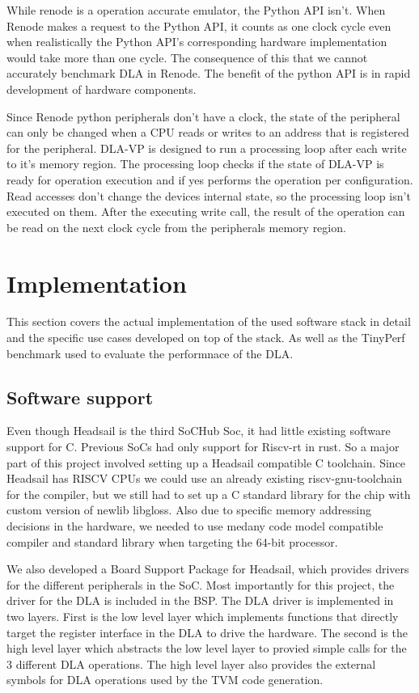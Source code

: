 \documentclass[12pt,a4paper,english
]{tunithesis}
\begin{document}
While renode is a operation accurate emulator, the Python API isn't. When Renode makes a request to the Python API, it counts as one clock cycle even when realistically the Python API's corresponding hardware implementation would take more than one cycle. The consequence of this that we cannot accurately benchmark DLA in Renode. The benefit of the python API is in rapid development of hardware components.

Since Renode python peripherals don't have a clock, the state of the peripheral can only be changed when a CPU reads or writes to an address that is registered for the peripheral. DLA-VP is designed to run a processing loop after each write to it's memory region. The processing loop checks if the state of DLA-VP is ready for operation execution and if yes performs the operation per configuration. Read accesses don't change the devices internal state, so the processing loop isn't executed on them. After the executing write call, the result of the operation can be read on the next clock cycle from the peripherals memory region.

\chapter{Implementation}
\label{ch:implementation}
This section covers the actual implementation of the used software stack in detail and the specific use cases developed on top of the stack. As well as the TinyPerf benchmark used to evaluate the performnace of the DLA.

\section{Software support}
\label{sec:software_support}
Even though Headsail is the third SoCHub Soc, it had little existing software support for C. Previous SoCs had only support for Riscv-rt in rust. So a major part of this project involved setting up a Headsail compatible C toolchain. Since Headsail has RISCV CPUs we could use an already existing riscv-gnu-toolchain for the compiler, but we still had to set up a C standard library for the chip with custom version of newlib libgloss. Also due to specific memory addressing decisions in the hardware, we needed to use medany code model compatible compiler and standard library when targeting the 64-bit processor.

We also developed a Board Support Package for Headsail, which provides drivers for the different peripherals in the SoC. Most importantly for this project, the driver for the DLA is included in the BSP.
The DLA driver is implemented in two layers. First is the low level layer which implements functions that directly target the register interface in the DLA to drive the hardware. The second is the high level layer which abstracts the low level layer to provied simple calls for the 3 different DLA operations. The high level layer also provides the external symbols for DLA operations used by the TVM code generation.
\end{document}
